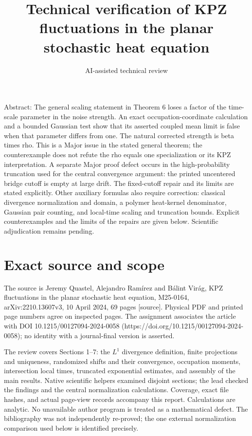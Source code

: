 \documentclass[10pt]{article}
\title{Technical verification of KPZ fluctuations in the planar stochastic heat equation}
\author{AI-assisted technical review}
\date{}
\begin{document}
\maketitle
Abstract: The general scaling statement in Theorem 6 loses a factor of the time-scale parameter in the noise strength. An exact occupation-coordinate calculation and a bounded Gaussian test show that its asserted coupled mean limit is false when that parameter differs from one. The natural corrected strength is beta times rho. This is a Major issue in the stated general theorem; the counterexample does not refute the rho equals one specialization or its KPZ interpretation. A separate Major proof defect occurs in the high-probability truncation used for the central convergence argument: the printed uncentered bridge cutoff is empty at large drift. The fixed-cutoff repair and its limits are stated explicitly. Other auxiliary formulas also require correction: classical divergence normalization and domain, a polymer heat-kernel denominator, Gaussian pair counting, and local-time scaling and truncation bounds. Explicit counterexamples and the limits of the repairs are given below. Scientific adjudication remains pending.\par
\section*{Exact source and scope}
The source is Jeremy Quastel, Alejandro Ramírez and Bálint Virág, KPZ fluctuations in the planar stochastic heat equation, M25-0164, arXiv:2210.13607v3, 10 April 2024, 69 pages [source]. Physical PDF and printed page numbers agree on inspected pages. The assignment associates the article with DOI 10.1215/00127094-2024-0058 (https://doi.org/10.1215/00127094-2024-0058); no identity with a journal-final version is asserted.\par
The review covers Sections 1–7: the \(L^1\) divergence definition, finite projections and uniqueness, randomized shifts and their convergence, occupation moments, intersection local times, truncated exponential estimates, and assembly of the main results. Native scientific helpers examined disjoint sections; the lead checked the findings and the central normalization calculations. Coverage, exact file hashes, and actual page-view records accompany this report. Calculations are analytic. No unavailable author program is treated as a mathematical defect. The bibliography was not independently re-proved; the one external normalization comparison used below is identified precisely.\par
\end{document}
